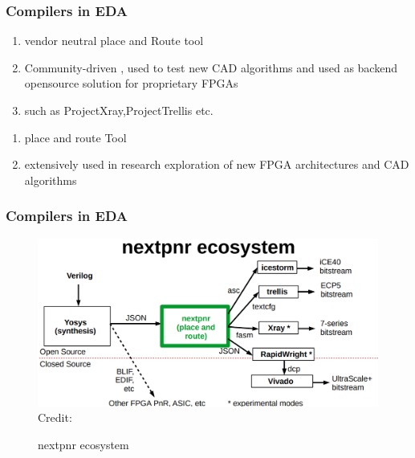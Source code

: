 \documentclass{beamer}
\begin{document}
{\begin{frame}[fragile]
   \frametitle{Compilers in EDA}
   \begin{enumerate}
   	\item vendor neutral place and Route tool 
	\item Community-driven , used to test new CAD algorithms and used as backend opensource solution for proprietary FPGAs 
	\item such as ProjectXray,ProjectTrellis etc.
   \end{enumerate}

   \begin{enumerate}
   	\item place and route Tool 
	\item extensively used in research exploration of new FPGA architectures and CAD algorithms
   \end{enumerate}
\end{frame}


\begin{frame}[fragile]
   \frametitle{Compilers in EDA}
     \begin{figure}
         \centering
	 \includegraphics[width=1\linewidth]{images/nextpnr_ecosystem.png}
	 \hspace*{1pt}\hbox{\scriptsize Credit:}
	 \caption{nextpnr ecosystem}
	 \label{exa_nextpnr}
     \end{figure}
\end{frame}


}
\end{document}

